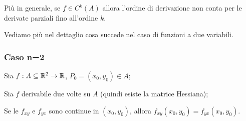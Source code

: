 Più in generale, se \(f \in C^{k}(A)\) allora l'ordine di derivazione non conta per le derivate parziali fino all'ordine \(k\).

Vediamo più nel dettaglio cosa succede nel caso di funzioni a due variabili.

\filbreak{}
\subsubsection*{Caso n=2}

Sia \(f: A \subseteq \mathbb{R}^{2} \rightarrow \mathbb{R} \), \(P_0=(x_0,y_0) \in A\);

Sia \(f\) derivabile due volte su \(A\) (quindi esiste la matrice Hessiana);

Se le \(f_{xy}\) e \(f_{yx}\) sono continue in \((x_0,y_0)\), allora \(f_{xy}(x_0,y_0) = f_{yx}(x_0,y_0)\).

